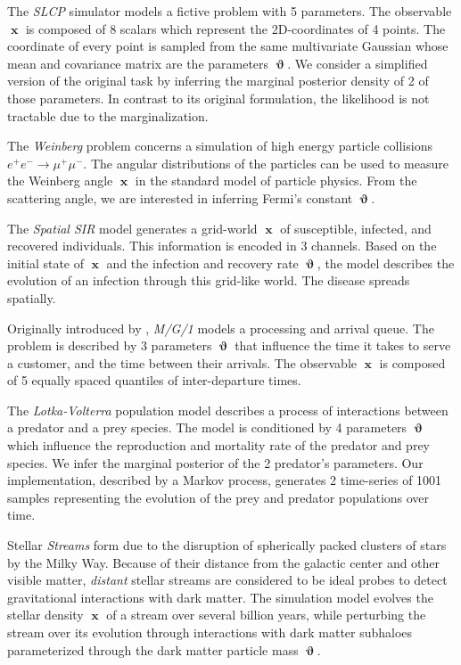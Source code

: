 \documentclass[twoside]{article}
\DeclareMathOperator{\vtheta}{\boldsymbol\vartheta}
\DeclareMathOperator{\vx}{\boldsymbol x}
\begin{document}
The \emph{SLCP} simulator models a fictive problem with 5 parameters. The observable $\vx$ is composed of 8 scalars which represent the 2D-coordinates of 4 points. 
The coordinate of every point is sampled from the same multivariate Gaussian whose mean and covariance matrix are the parameters $\vtheta$. We consider a simplified version of the original task \citep{papamakarios2019sequential} by inferring the marginal posterior density of 2 of those parameters. In contrast to its original formulation, the likelihood is not tractable due to the marginalization.

The \emph{Weinberg} problem \citep{weinberg} concerns a simulation of high energy particle collisions $e^+e^- \to \mu^+ \mu^-$. The angular distributions of the particles can be used to measure the Weinberg angle $\vx$
in the standard model of particle physics. From the scattering angle, we are interested in inferring Fermi's constant $\vtheta$.

The \emph{Spatial SIR} model generates a grid-world $\vx$ of susceptible,
infected, and recovered individuals. This information is encoded in 3
channels. Based on the initial state of $\vx$ and the infection and recovery rate $\vtheta$,
the model describes the evolution of an infection through this grid-like world.
The disease spreads spatially.

Originally introduced by \citet{papamakarios2019sequential}, \emph{M/G/1} models a processing and arrival queue. The problem is
described by 3 parameters $\vtheta$ that influence the time it takes to serve a customer, and the time between their arrivals. The observable $\vx$ is composed of 5 equally spaced quantiles of inter-departure times.

The \emph{Lotka-Volterra} population model \citep{lotka,volterra1926fluctuations} describes a process of interactions between a predator and a prey species. The model is conditioned by 4 parameters $\vtheta$ which influence the reproduction and mortality rate of the predator and prey species. We infer the marginal posterior of the 2 predator's parameters. Our implementation, described by a Markov process, generates 2 time-series of 1001 samples representing the evolution of the prey and predator populations over time.

Stellar \emph{Streams} form due to the disruption of spherically packed clusters of stars by the Milky Way. Because of their distance from the galactic center and other visible matter, \emph{distant} stellar streams are considered to be ideal probes to detect gravitational interactions with dark matter. The simulation model \citep{bovy2015galpy,banik2018probing,Hermans:2020skz} evolves the stellar density $\vx$ of a stream over several billion years, while perturbing the stream over its evolution through interactions with dark matter subhaloes parameterized through the dark matter particle mass $\vtheta$. 
\end{document}
